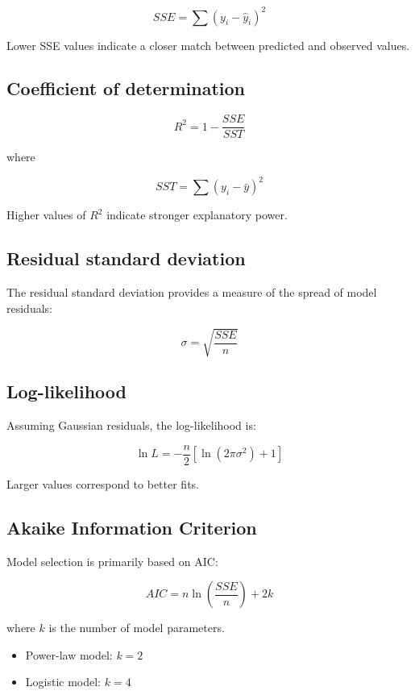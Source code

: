 \documentclass[11pt]{article}
\begin{document}
\[
SSE = \sum (y_i - \hat{y}_i)^2
\]

Lower SSE values indicate a closer match between predicted and observed values.

\subsection{Coefficient of determination}

\[
R^2 = 1 - \frac{SSE}{SST}
\]

where

\[
SST = \sum (y_i - \bar{y})^2
\]

Higher values of $R^2$ indicate stronger explanatory power.

\subsection{Residual standard deviation}

The residual standard deviation provides a measure of the spread of model residuals:

\[
\sigma = \sqrt{\frac{SSE}{n}}
\]

\subsection{Log-likelihood}

Assuming Gaussian residuals, the log-likelihood is:

\[
\ln L =
-\frac{n}{2}
\left[
\ln(2\pi\sigma^2) + 1
\right]
\]

Larger values correspond to better fits.

\subsection{Akaike Information Criterion}

Model selection is primarily based on AIC:

\[
AIC = n\ln\left(\frac{SSE}{n}\right) + 2k
\]

where $k$ is the number of model parameters.

\begin{itemize}

\item Power-law model: $k=2$

\item Logistic model: $k=4$

\end{itemize}
\end{document}
